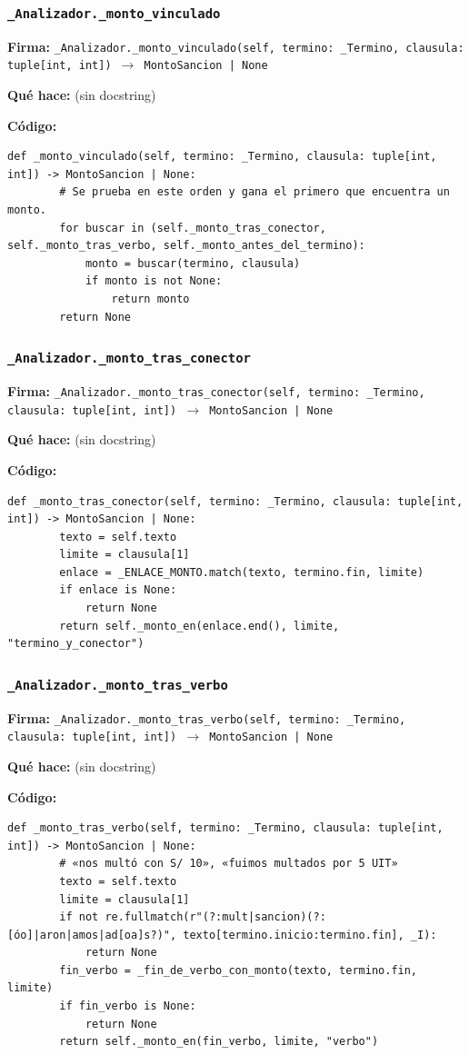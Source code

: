 \documentclass[11pt,a4paper]{article}
\begin{document}
\subsubsection*{\texttt{\_Analizador.\_monto\_vinculado}}
\textbf{Firma:} \texttt{\_Analizador.\_monto\_vinculado(self, termino: \_Termino, clausula: tuple[int, int]) $\rightarrow$ MontoSancion | None}

\textbf{Qué hace:} (sin docstring)

\textbf{Código:}
\begin{lstlisting}
def _monto_vinculado(self, termino: _Termino, clausula: tuple[int, int]) -> MontoSancion | None:
        # Se prueba en este orden y gana el primero que encuentra un monto.
        for buscar in (self._monto_tras_conector, self._monto_tras_verbo, self._monto_antes_del_termino):
            monto = buscar(termino, clausula)
            if monto is not None:
                return monto
        return None
\end{lstlisting}

\subsubsection*{\texttt{\_Analizador.\_monto\_tras\_conector}}
\textbf{Firma:} \texttt{\_Analizador.\_monto\_tras\_conector(self, termino: \_Termino, clausula: tuple[int, int]) $\rightarrow$ MontoSancion | None}

\textbf{Qué hace:} (sin docstring)

\textbf{Código:}
\begin{lstlisting}
def _monto_tras_conector(self, termino: _Termino, clausula: tuple[int, int]) -> MontoSancion | None:
        texto = self.texto
        limite = clausula[1]
        enlace = _ENLACE_MONTO.match(texto, termino.fin, limite)
        if enlace is None:
            return None
        return self._monto_en(enlace.end(), limite, "termino_y_conector")
\end{lstlisting}

\subsubsection*{\texttt{\_Analizador.\_monto\_tras\_verbo}}
\textbf{Firma:} \texttt{\_Analizador.\_monto\_tras\_verbo(self, termino: \_Termino, clausula: tuple[int, int]) $\rightarrow$ MontoSancion | None}

\textbf{Qué hace:} (sin docstring)

\textbf{Código:}
\begin{lstlisting}
def _monto_tras_verbo(self, termino: _Termino, clausula: tuple[int, int]) -> MontoSancion | None:
        # «nos multó con S/ 10», «fuimos multados por 5 UIT»
        texto = self.texto
        limite = clausula[1]
        if not re.fullmatch(r"(?:mult|sancion)(?:[óo]|aron|amos|ad[oa]s?)", texto[termino.inicio:termino.fin], _I):
            return None
        fin_verbo = _fin_de_verbo_con_monto(texto, termino.fin, limite)
        if fin_verbo is None:
            return None
        return self._monto_en(fin_verbo, limite, "verbo")
\end{lstlisting}
\end{document}
